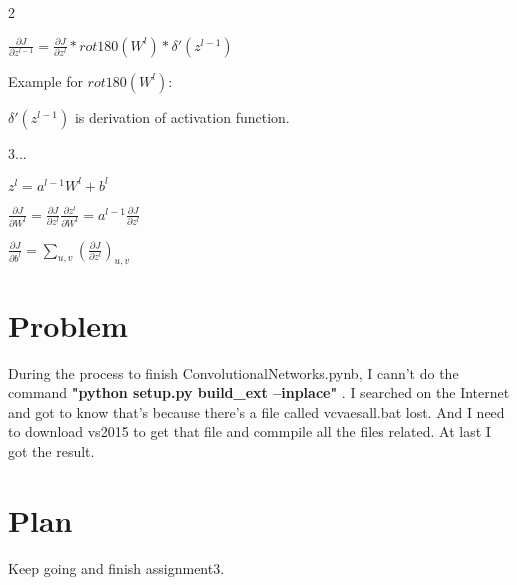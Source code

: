 \documentclass{article}
\begin{document}
2
\begin{center}
	${\displaystyle \frac{\partial J}{\partial z^{l-1}}=\frac{\partial J}{\partial z^l}*rot180(W^l)*\delta'(z^{l-1})}$
\end{center}

Example for ${\displaystyle rot180(W^l)}$:

\begin{center}
	
\end{center}
	
${\displaystyle \delta'(z^{l-1})}$ is derivation of activation function.
	
3...
\begin{center}
	${\displaystyle z^l=a^{l-1}W^l+b^l}$
	
	${\displaystyle \frac{\partial J}{\partial W^l}=\frac{\partial J}{\partial z^l}\frac{\partial z^l}{\partial W^l}=a^{l-1}\frac{\partial J}{\partial z^l}}$
	
	${\displaystyle \frac{\partial J}{\partial b^l} = \sum_{u,v}(\frac{\partial J}{\partial z^l})_{u,v}}$
\end{center}

\section{Problem}
During the process to finish ConvolutionalNetworks.pynb, I cann't do the command
\textbf{"python setup.py build\_ext --inplace"}
. I searched on the Internet and got to know that's because there's a file called vcvaesall.bat lost. And I need to download vs2015 to get that file and commpile all the files related. At last I got the result.

\section{Plan}
Keep going and finish assignment3.
\end{document}
